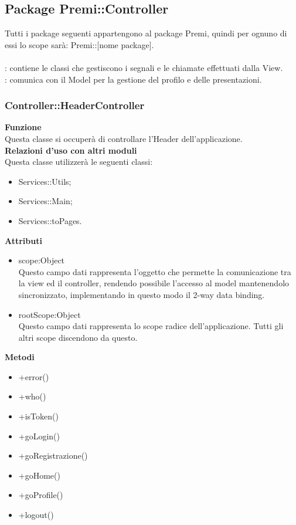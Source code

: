 \subsection{Package Premi::Controller}{
		\label{sec:controller}
		Tutti i package seguenti appartengono al package Premi, quindi per ognuno di essi lo scope sarà: Premi::[nome package].\\\\
		\textbf{\tipo}: contiene le classi che gestiscono i segnali e le chiamate effettuati dalla View.\\
		\textbf{\relaz}: comunica con il Model per la gestione del profilo e delle presentazioni.\\
		\subsubsection{Controller::HeaderController}
		\label{sub:HeaderController}
		\textbf{Funzione}\\
		\indent Questa classe si occuperà di controllare l'Header dell'applicazione.\\
		\textbf{Relazioni d'uso con altri moduli}\\
		\indent Questa classe utilizzerà le seguenti classi:
		\begin{itemize}
		\item Services::Utils;
		\item Services::Main;
		\item Services::toPages.
		\end{itemize}
		\textbf{Attributi}\\
		\begin{itemize}
		\item scope:Object\\
		Questo campo dati rappresenta l’oggetto che permette la comunicazione tra la view ed il controller, rendendo possibile l’accesso al model mantenendolo sincronizzato, implementando in questo modo il 2-way data binding.
		\item rootScope:Object\\
		Questo campo dati rappresenta lo scope radice dell’applicazione. Tutti gli altri scope	discendono da questo.
		\end{itemize}
		\textbf{Metodi}
		\begin{itemize}
		\item +error()
		\item +who()
		\item +isToken()
		\item +goLogin()
		\item +goRegistrazione()
		\item +goHome()
		\item +goProfile()
		\item +logout()
		\end{itemize}
}

